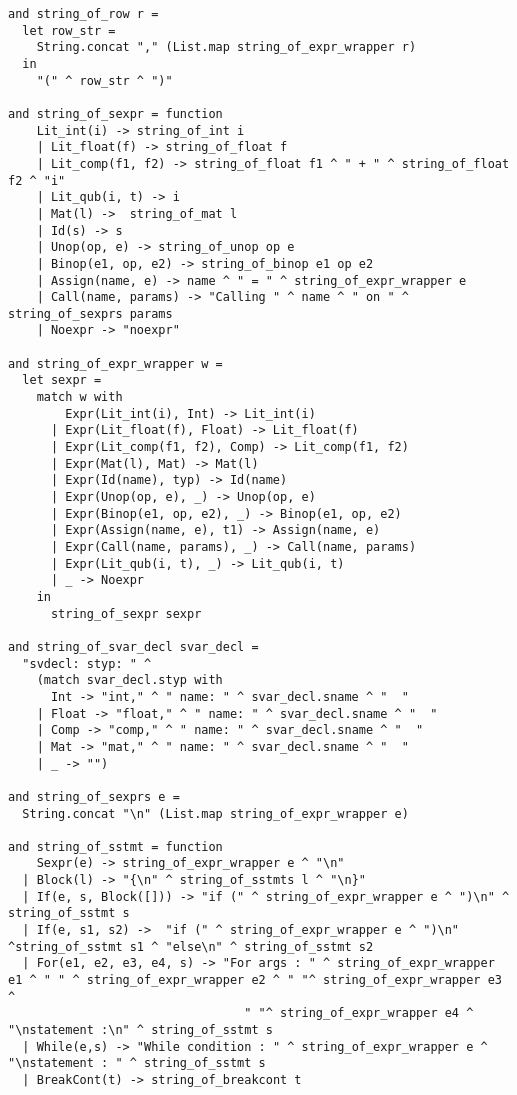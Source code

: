 \begin{lstlisting}
and string_of_row r =
  let row_str = 
    String.concat "," (List.map string_of_expr_wrapper r)
  in
    "(" ^ row_str ^ ")"

and string_of_sexpr = function
    Lit_int(i) -> string_of_int i
    | Lit_float(f) -> string_of_float f
    | Lit_comp(f1, f2) -> string_of_float f1 ^ " + " ^ string_of_float f2 ^ "i"
    | Lit_qub(i, t) -> i
    | Mat(l) ->  string_of_mat l
    | Id(s) -> s
    | Unop(op, e) -> string_of_unop op e
    | Binop(e1, op, e2) -> string_of_binop e1 op e2
    | Assign(name, e) -> name ^ " = " ^ string_of_expr_wrapper e
    | Call(name, params) -> "Calling " ^ name ^ " on " ^ string_of_sexprs params
    | Noexpr -> "noexpr"

and string_of_expr_wrapper w =
  let sexpr =
    match w with
        Expr(Lit_int(i), Int) -> Lit_int(i)
      | Expr(Lit_float(f), Float) -> Lit_float(f)
      | Expr(Lit_comp(f1, f2), Comp) -> Lit_comp(f1, f2)
      | Expr(Mat(l), Mat) -> Mat(l)
      | Expr(Id(name), typ) -> Id(name)
      | Expr(Unop(op, e), _) -> Unop(op, e) 
      | Expr(Binop(e1, op, e2), _) -> Binop(e1, op, e2)
      | Expr(Assign(name, e), t1) -> Assign(name, e)
      | Expr(Call(name, params), _) -> Call(name, params)
      | Expr(Lit_qub(i, t), _) -> Lit_qub(i, t)
      | _ -> Noexpr
    in
      string_of_sexpr sexpr

and string_of_svar_decl svar_decl = 
  "svdecl: styp: " ^ 
    (match svar_decl.styp with
      Int -> "int," ^ " name: " ^ svar_decl.sname ^ "  "
    | Float -> "float," ^ " name: " ^ svar_decl.sname ^ "  "
    | Comp -> "comp," ^ " name: " ^ svar_decl.sname ^ "  "
    | Mat -> "mat," ^ " name: " ^ svar_decl.sname ^ "  "
    | _ -> "")

and string_of_sexprs e = 
  String.concat "\n" (List.map string_of_expr_wrapper e)

and string_of_sstmt = function
    Sexpr(e) -> string_of_expr_wrapper e ^ "\n"
  | Block(l) -> "{\n" ^ string_of_sstmts l ^ "\n}"
  | If(e, s, Block([])) -> "if (" ^ string_of_expr_wrapper e ^ ")\n" ^ string_of_sstmt s
  | If(e, s1, s2) ->  "if (" ^ string_of_expr_wrapper e ^ ")\n" ^string_of_sstmt s1 ^ "else\n" ^ string_of_sstmt s2
  | For(e1, e2, e3, e4, s) -> "For args : " ^ string_of_expr_wrapper e1 ^ " " ^ string_of_expr_wrapper e2 ^ " "^ string_of_expr_wrapper e3 ^ 
                                 " "^ string_of_expr_wrapper e4 ^ "\nstatement :\n" ^ string_of_sstmt s 
  | While(e,s) -> "While condition : " ^ string_of_expr_wrapper e ^ "\nstatement : " ^ string_of_sstmt s
  | BreakCont(t) -> string_of_breakcont t


\end{lstlisting}
